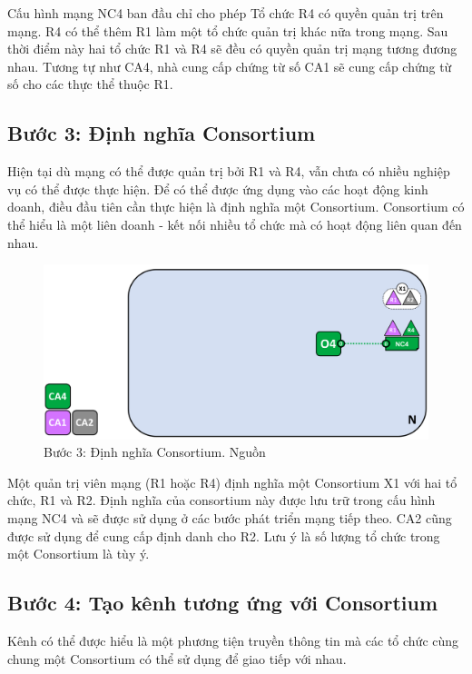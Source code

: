 \documentclass[../DoAn.tex]{subfiles}
\begin{document}
Cấu hình mạng NC4 ban đầu chỉ cho phép Tổ chức R4 có quyền quản trị trên mạng.
R4 có thể thêm R1 làm một tổ chức quản trị khác nữa trong mạng. Sau thời điểm
này hai tổ chức R1 và R4 sẽ đều có quyền quản trị mạng tương đương nhau. Tương
tự như CA4, nhà cung cấp chứng từ số CA1 sẽ cung cấp chứng từ số cho các thực
thể thuộc R1.

\subsection{Bước 3: Định nghĩa Consortium}

Hiện tại dù mạng có thể được quản trị bởi R1 và R4, vẫn chưa có nhiều nghiệp vụ
có thể được thực hiện. Để có thể được ứng dụng vào các hoạt động kinh doanh,
điều đầu tiên cần thực hiện là định nghĩa một Consortium. Consortium có thể
hiểu là một liên doanh - kết nối nhiều tổ chức mà có hoạt động liên quan đến
nhau.

\begin{figure}[h]
  \centering
  \includegraphics[width=0.7\linewidth]{Hinhve/network.diagram.3.png}
  \caption[Bước 3: Định nghĩa Consortium]{Bước 3: Định nghĩa Consortium. Nguồn \cite{fabric_architecture}}
  \label{fig:fabric_step_3}
\end{figure}

Một quản trị viên mạng (R1 hoặc R4) định nghĩa một Consortium X1 với hai tổ
chức, R1 và R2. Định nghĩa của consortium này được lưu trữ trong cấu hình mạng
NC4 và sẽ được sử dụng ở các bước phát triển mạng tiếp theo. CA2 cũng được sử
dụng để cung cấp định danh cho R2. Lưu ý là số lượng tổ chức trong một
Consortium là tùy ý.

\subsection{Bước 4: Tạo kênh tương ứng với Consortium}

Kênh có thể được hiểu là một phương tiện truyền thông tin mà các tổ chức cùng
chung một Consortium có thể sử dụng để giao tiếp với nhau.
\end{document}
